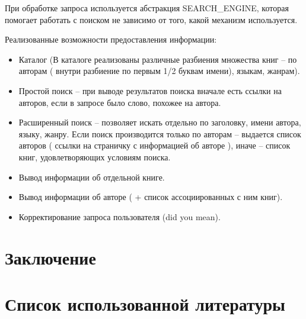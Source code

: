 \documentclass[a4paper, 12pt]{report}
\begin{document}
При обработке запроса используется абстракция SEARCH\_ENGINE, которая помогает работать с поиском не зависимо от того, какой механизм используется.


Реализованные возможности предоставления информации:
\begin{itemize}
	\item Каталог (В каталоге реализованы различные разбиения множества книг -- по авторам ( внутри разбиение по первым 1/2 буквам имени), языкам, жанрам).
	\item Простой поиск -- при выводе результатов поиска вначале есть ссылки на авторов, если в запросе было слово, похожее на автора.
	\item Расширенный поиск -- позволяет искать отдельно по заголовку, имени автора, языку, жанру. Если поиск производится только по авторам -- выдается список авторов ( ссылки на страничку с информацией об авторе ), иначе -- список книг, удовлетворяющих условиям поиска.
\item Вывод информации об отдельной книге.
\item Вывод информации об авторе ( + список ассоциированных с ним книг).
\item Корректирование запроса пользователя (did you mean).
\end{itemize}




 
\newpage
\section{Заключение}
\section{Список использованной литературы}
\end{document}
